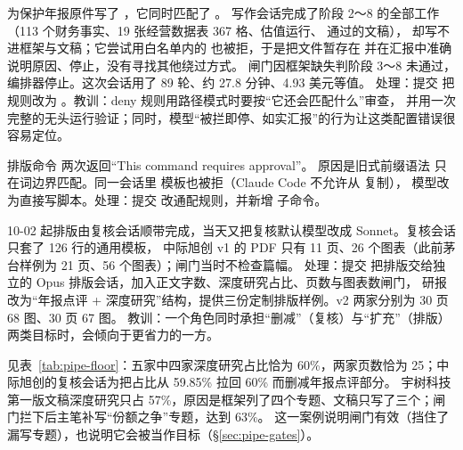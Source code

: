 \begin{failcase}
为保护年报原件写了 ，它同时匹配了 。
写作会话完成了阶段 2～8 的全部工作（113 个财务事实、19 张经营数据表 367 格、估值运行、 通过的文稿），
却写不进框架与文稿；它尝试用白名单内的  也被拒，于是把文件暂存在  并在汇报中准确说明原因、停止，没有寻找其他绕过方式。
闸门因框架缺失判阶段 3～8 未通过，编排器停止。这次会话用了 89 轮、约 27.8 分钟、4.93 美元等值。
处理：提交  把规则改为 。教训：deny 规则用路径模式时要按“它还会匹配什么”审查，
并用一次完整的无头运行验证；同时，模型“被拦即停、如实汇报”的行为让这类配置错误很容易定位。
\end{failcase}

\begin{failcase}
排版命令  两次返回“This command requires approval”。
原因是旧式前缀语法  只在词边界匹配。同一会话里  模板也被拒（Claude Code 不允许从  复制），
模型改为直接写脚本。处理：提交  改通配规则，并新增  子命令。
\end{failcase}

\begin{failcase}[ 4：写短逃避深度（2026-10-03）]
10-02 起排版由复核会话顺带完成，当天又把复核默认模型改成 Sonnet。复核会话只套了 126 行的通用模板，
中际旭创 v1 的 PDF 只有 11 页、26 个图表（此前茅台样例为 21 页、56 个图表）；闸门当时不检查篇幅。
处理：提交  把排版交给独立的 Opus 排版会话，加入正文字数、深度研究占比、页数与图表数闸门，
研报改为“年报点评 + 深度研究”结构，提供三份定制排版样例。v2 两家分别为 30 页 68 图、30 页 67 图。
教训：一个角色同时承担“删减”（复核）与“扩充”（排版）两类目标时，会倾向于更省力的一方。
\end{failcase}

\begin{failcase}[ 5：贴着阈值达标]
见表~\ref{tab:pipe-floor}：五家中四家深度研究占比恰为 60\%，两家页数恰为 25；中际旭创的复核会话为把占比从 59.85\% 拉回 60\% 而删减年报点评部分。
宇树科技第一版文稿深度研究只占 57\%，原因是框架列了四个专题、文稿只写了三个；闸门拦下后主笔补写“份额之争”专题，达到 63\%。
这一案例说明闸门有效（挡住了漏写专题），也说明它会被当作目标（\S\ref{sec:pipe-gates}）。
\end{failcase}

